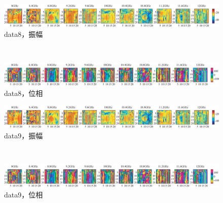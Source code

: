 ﻿\documentclass[12pt,oneside]{jsbook}
\begin{document}
\begin{figure}[hbtp]
 \begin{center}
     \begin{minipage}[c]{\hsize}
\includegraphics[width = \hsize ]{20170205_mine8_a.eps}
\centering\textmd{data8，振幅}
  \end{minipage}
\\
     \begin{minipage}[c]{\hsize}
\includegraphics[width = \hsize ]{20170205_mine8_p.eps}
\centering\textmd{data8，位相}
  \end{minipage}
\end{center}
\end{figure}
\begin{figure}[hbtp]
 \begin{center}
     \begin{minipage}[c]{\hsize}
\includegraphics[width = \hsize ]{20170205_mine9_a.eps}
\centering\textmd{data9，振幅}
  \end{minipage}
\\
     \begin{minipage}[c]{\hsize}
\includegraphics[width = \hsize ]{20170205_mine9_p.eps}
\centering\textmd{data9，位相}
  \end{minipage}
\end{center}
\end{figure}
\end{document}
